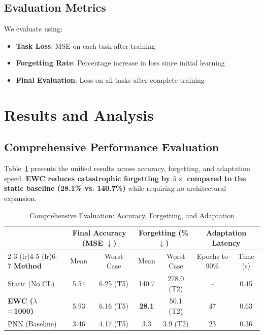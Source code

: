 \documentclass[journal,12pt,onecolumn]{IEEEtran}
\begin{document}
\subsection{Evaluation Metrics}

We evaluate using:
\begin{itemize}
    \item \textbf{Task Loss}: MSE on each task after training
    \item \textbf{Forgetting Rate}: Percentage increase in loss since initial learning
    \item \textbf{Final Evaluation}: Loss on all tasks after complete training
\end{itemize}

\section{Results and Analysis}
\label{sec:results}

\subsection{Comprehensive Performance Evaluation}

Table~\ref{tab:comprehensive} presents the unified results across accuracy, forgetting, and adaptation speed. \textbf{EWC reduces catastrophic forgetting by $5\times$ compared to the static baseline (28.1\% vs. 140.7\%)} while requiring no architectural expansion.

\begin{table}[htbp]
\caption{Comprehensive Evaluation: Accuracy, Forgetting, and Adaptation}
\label{tab:comprehensive}
\centering
\begin{tabular}{lcccccc}
\toprule
& \multicolumn{2}{c}{\textbf{Final Accuracy (MSE $\downarrow$)}} & \multicolumn{2}{c}{\textbf{Forgetting (\% $\downarrow$)}} & \multicolumn{2}{c}{\textbf{Adaptation Latency}} \\
\cmidrule(lr){2-3} \cmidrule(lr){4-5} \cmidrule(lr){6-7}
\textbf{Method} & Mean & Worst Case & Mean & Worst Case & Epochs to 90\% & Time (s) \\
\midrule
Static (No CL) & 5.54 & 6.25 (T5) & 140.7 & 278.0 (T2) & -- & 0.45 \\
\textbf{EWC ($\lambda$=1000)} & 5.93 & 6.16 (T5) & \textbf{28.1} & 50.1 (T2) & 47 & 0.63 \\
PNN (Baseline) & 3.46 & 4.17 (T5) & 3.3 & 3.9 (T2) & 23 & 0.36 \\
\bottomrule
\end{tabular}
\end{table}
\end{document}
